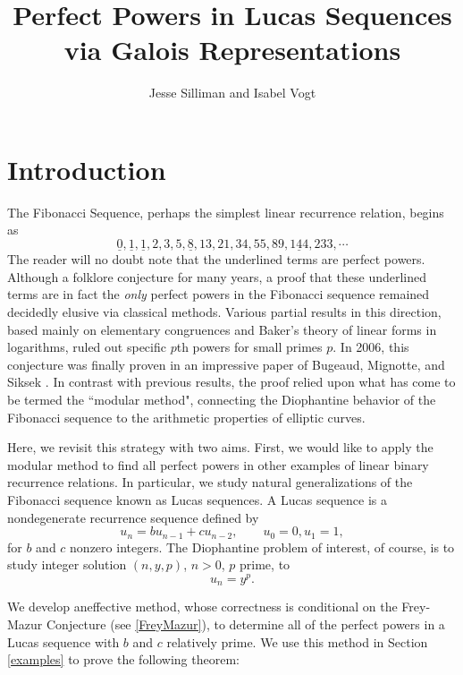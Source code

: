 \documentclass[12pt]{amsart}
\theoremstyle{definition}
\begin{document}
\title{Perfect Powers in Lucas Sequences via Galois Representations}
\author{Jesse Silliman and Isabel Vogt}

\maketitle


\section{Introduction}
The Fibonacci Sequence, perhaps the simplest linear recurrence relation, begins as \[\underline{0},\underline{1},\underline{1},2,3,5,\underline{8},13,21,34,55,89,\underline{144},233, \cdots\] The reader will no doubt note that the underlined terms are perfect powers. Although a folklore conjecture for many years, a proof that these underlined terms are in fact the \emph{only} perfect powers in the Fibonacci sequence remained decidedly elusive via classical methods. Various partial results in this direction, based mainly on elementary congruences and Baker's theory of linear forms in logarithms, ruled out specific $p$th powers for small primes $p$. In 2006, this conjecture was finally proven in an impressive paper of Bugeaud, Mignotte, and Siksek \cite{siksek06}. In contrast with previous results, the proof relied upon what has come to be termed the ``modular method", connecting the Diophantine behavior of the Fibonacci sequence to the arithmetic properties of elliptic curves.

Here, we revisit this strategy with two aims. First, we would like to apply the modular method to find all perfect powers in other examples of linear binary recurrence relations.  In particular, we study natural generalizations of the Fibonacci sequence known as Lucas sequences.  A Lucas sequence is a nondegenerate recurrence sequence defined by \[ u_n = b u_{n-1} + c u_{n-2}, \qquad u_0 = 0, u_1 = 1, \] for $b$ and $c$ nonzero integers.  The Diophantine problem of interest, of course, is to study integer solution $(n,y,p)$, $n > 0$, $p$ prime, to \begin{equation}\label{the_eqn}u_n = y^p.\end{equation}

We develop aneffective method, whose correctness is conditional on the Frey-Mazur Conjecture (see \ref{FreyMazur}), to determine all of the perfect powers in a Lucas sequence with $b$ and $c$ relatively prime.  We use this method in Section \ref{examples} to prove the following theorem:
\end{document}
